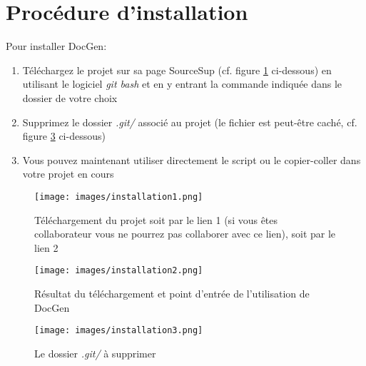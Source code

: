 \documentclass[./standalone.tex]{subfiles}
\begin{document}
\section{Procédure d'installation}
\bigskip

Pour installer DocGen:
\begin{enumerate}
    \item Téléchargez le projet sur sa page SourceSup (cf. figure     \ref{fig:installation1} ci-dessous) en utilisant le logiciel \textit{git bash} et en y entrant la commande indiquée dans le dossier de votre choix
    \item Supprimez le dossier \textit{.git/} associé au projet (le fichier est peut-être caché, cf. figure \ref{fig:installation3} ci-dessous)
    \item Vous pouvez maintenant utiliser directement le script ou le copier-coller dans votre projet en cours\\
\end{enumerate}
\vspace{1cm}

\begin{figure}[h!]
    \centering
    \texttt{[image: images/installation1.png]}
    \caption{Téléchargement du projet soit par le lien 1 (si vous êtes collaborateur vous ne pourrez pas collaborer avec ce lien), soit par le lien 2}
    \label{fig:installation1}
\end{figure}
\vspace{1cm}

\begin{figure}[h!]
    \centering
    \texttt{[image: images/installation2.png]}
    \caption{Résultat du téléchargement et point d'entrée de l'utilisation de DocGen}
    \label{fig:installation2}
\end{figure}
\vspace{1cm}

\begin{figure}[h!]
    \centering
    \texttt{[image: images/installation3.png]}
    \caption{Le dossier \textit{.git/} à supprimer}
    \label{fig:installation3}
\end{figure}
\end{document}
